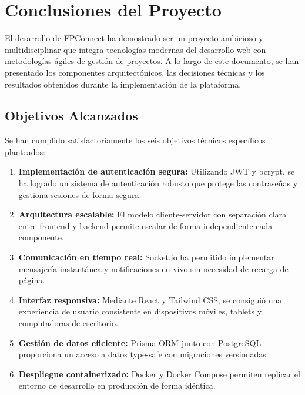 \documentclass[a4paper]{report}
\begin{document}
\section*{Conclusiones del Proyecto}

El desarrollo de FPConnect ha demostrado ser un proyecto ambicioso y multidisciplinar que integra tecnologías modernas del desarrollo web con metodologías ágiles de gestión de proyectos. A lo largo de este documento, se han presentado los componentes arquitectónicos, las decisiones técnicas y los resultados obtenidos durante la implementación de la plataforma.

\subsection*{Objetivos Alcanzados}

Se han cumplido satisfactoriamente los seis objetivos técnicos específicos planteados:

\begin{enumerate}
  \item \textbf{Implementación de autenticación segura:} Utilizando JWT y bcrypt, se ha logrado un sistema de autenticación robusto que protege las contraseñas y gestiona sesiones de forma segura.
  
  \item \textbf{Arquitectura escalable:} El modelo cliente-servidor con separación clara entre frontend y backend permite escalar de forma independiente cada componente.
  
  \item \textbf{Comunicación en tiempo real:} Socket.io ha permitido implementar mensajería instantánea y notificaciones en vivo sin necesidad de recarga de página.
  
  \item \textbf{Interfaz responsiva:} Mediante React y Tailwind CSS, se consiguió una experiencia de usuario consistente en dispositivos móviles, tablets y computadoras de escritorio.
  
  \item \textbf{Gestión de datos eficiente:} Prisma ORM junto con PostgreSQL proporciona un acceso a datos type-safe con migraciones versionadas.
  
  \item \textbf{Despliegue containerizado:} Docker y Docker Compose permiten replicar el entorno de desarrollo en producción de forma idéntica.
\end{enumerate}
\end{document}
